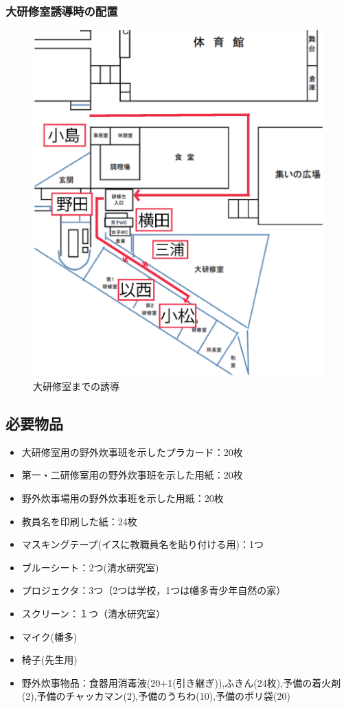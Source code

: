 \subsubsection{大研修室誘導時の配置}
\begin{figure}[htbp]
  \begin{center}
   \includegraphics[scale=0.4]{./03/yuudou.eps}
  \end{center}
  \caption{大研修室までの誘導}
  \label{fig:hare}
\end{figure}

\newpage

\subsection{必要物品}
\begin{itemize}
\item 大研修室用の野外炊事班を示したプラカード：20枚
\item 第一・二研修室用の野外炊事班を示した用紙：20枚
\item 野外炊事場用の野外炊事班を示した用紙：20枚
\item 教員名を印刷した紙：24枚
\item マスキングテープ(イスに教職員名を貼り付ける用)：1つ
\item ブルーシート：2つ(清水研究室)
\item プロジェクタ：3つ（2つは学校，1つは幡多青少年自然の家）
\item スクリーン：１つ（清水研究室）
\item マイク(幡多)
\item 椅子(先生用)
\item 野外炊事物品：食器用消毒液(20+1(引き継ぎ)),ふきん(24枚),予備の着火剤(2),予備のチャッカマン(2),予備のうちわ(10),予備のポリ袋(20)
\end{itemize}

